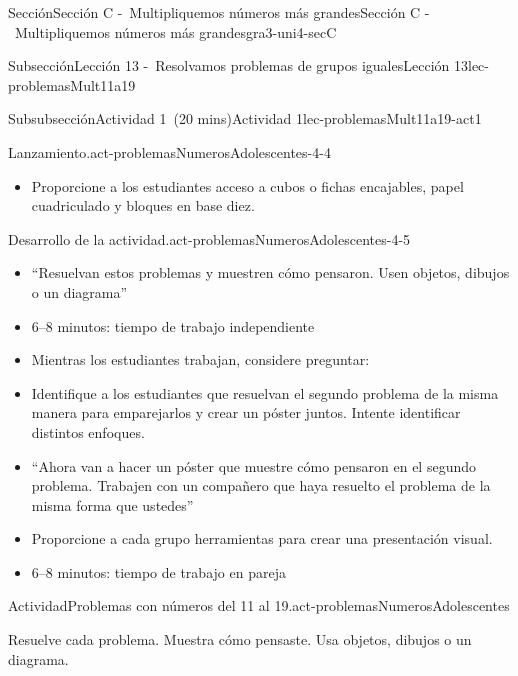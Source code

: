 \documentclass[oneside,10pt,]{article}
\newlength{\fillinmaxwidth}
\newlength{\fillincontract}
\newlength{\charmaxwidth}\setlength{\charmaxwidth}{0.5em}
\newlength{\charminwidth}\setlength{\charminwidth}{0.1em}
\newlength{\fillinheight}
\newcommand{\fillintext}[1]{%
\setlength{\fillinmaxwidth}{#1\charmaxwidth}%
\setlength{\fillincontract}{#1\charminwidth}%
\setlength{\fillinheight}{\baselineskip}\addtolength{\fillinheight}{1.2pt}%
\strut\nobreak\leaders\vbox{\hrule width 0.3pt height 0.3pt \vskip -1.2pt}\hskip 1\fillinmaxwidth minus \fillincontract\nobreak\strut%
}
\begin{document}
\begin{sectionptx}{Sección}{Sección C -~Multipliquemos números más grandes}{}{Sección C -~Multipliquemos números más grandes}{}{}{gra3-uni4-secC}
\begin{subsectionptx}{Subsección}{Lección 13 -~Resolvamos problemas de grupos iguales}{}{Lección 13}{}{}{lec-problemasMult11a19}
\begin{subsubsectionptx}{Subsubsección}{Actividad 1~(20 mins)}{}{Actividad 1}{}{}{lec-problemasMult11a19-act1}
\begin{paragraphs}{Lanzamiento.}{act-problemasNumerosAdolescentes-4-4}
\begin{itemize}[label=\textbullet]
\item{}Proporcione a los estudiantes acceso a cubos o fichas encajables, papel cuadriculado y bloques en base diez.%
\end{itemize}
\end{paragraphs}%
\begin{paragraphs}{Desarrollo de la actividad.}{act-problemasNumerosAdolescentes-4-5}%
%
\begin{itemize}[label=\textbullet]
\item{}``Resuelvan estos problemas y muestren cómo pensaron. Usen objetos, dibujos o un diagrama''%
\item{}6–8 minutos: tiempo de trabajo independiente%
\item{}Mientras los estudiantes trabajan, considere preguntar:%
%
\item{}Identifique a los estudiantes que resuelvan el segundo problema de la misma manera para emparejarlos y crear un póster juntos. Intente identificar distintos enfoques.%
\item{}``Ahora van a hacer un póster que muestre cómo pensaron en el segundo problema. Trabajen con un compañero que haya resuelto el problema de la misma forma que ustedes''%
\item{}Proporcione a cada grupo herramientas para crear una presentación visual.%
\item{}6–8 minutos: tiempo de trabajo en pareja%
\end{itemize}
\end{paragraphs}%
\begin{activity}{Actividad}{Problemas con números del 11 al 19.}{act-problemasNumerosAdolescentes}%
\begin{sidebyside}{2}{0.05}{0.05}{0.1}%
\begin{sbspanel}{0.5}%
Resuelve cada problema. Muestra cómo pensaste. Usa objetos, dibujos o un diagrama.%
\end{sbspanel}%
\begin{sbspanel}{0.3}%

\end{sbspanel}
\end{sidebyside}
\end{activity}
\end{subsubsectionptx}
\end{subsectionptx}
\end{sectionptx}
\end{document}
